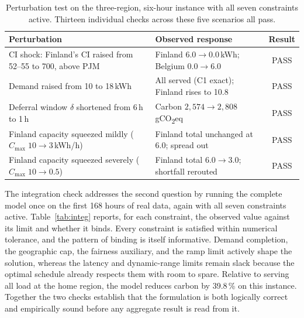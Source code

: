 \begin{table}[tbp]
\centering\small
\renewcommand{\arraystretch}{1.25}
\begin{tabularx}{\linewidth}{Xlc}
\toprule
\textbf{Perturbation} & \textbf{Observed response} & \textbf{Result} \\
\midrule
CI shock: Finland's CI raised from 52--55 to 700, above PJM & Finland $6.0 \to 0.0$\,kWh; Belgium $0.0 \to 6.0$ & PASS \\
Demand raised from 10 to 18\,kWh & All served (C1 exact); Finland rises to 10.8 & PASS \\
Deferral window $\delta$ shortened from 6\,h to 1\,h & Carbon $2{,}574 \to 2{,}808$\,gCO\textsubscript{2}eq & PASS \\
Finland capacity squeezed mildly ($C_{\max}\;10 \to 3$\,kWh/h) & Finland total unchanged at 6.0; spread out & PASS \\
Finland capacity squeezed severely ($C_{\max}\;10 \to 0.5$) & Finland total $6.0 \to 3.0$; shortfall rerouted & PASS \\
\bottomrule
\end{tabularx}
\caption{Perturbation test on the three-region, six-hour instance with all seven constraints active. Thirteen individual checks across these five scenarios all pass.}
\label{tab:pert}
\end{table}

The integration check addresses the second question by running the complete model once on the first 168 hours of real data, again with all seven constraints active. Table~\ref{tab:integ} reports, for each constraint, the observed value against its limit and whether it binds. Every constraint is satisfied within numerical tolerance, and the pattern of binding is itself informative. Demand completion, the geographic cap, the fairness auxiliary, and the ramp limit actively shape the solution, whereas the latency and dynamic-range limits remain slack because the optimal schedule already respects them with room to spare. Relative to serving all load at the home region, the model reduces carbon by 39.8\,\% on this instance. Together the two checks establish that the formulation is both logically correct and empirically sound before any aggregate result is read from it.

